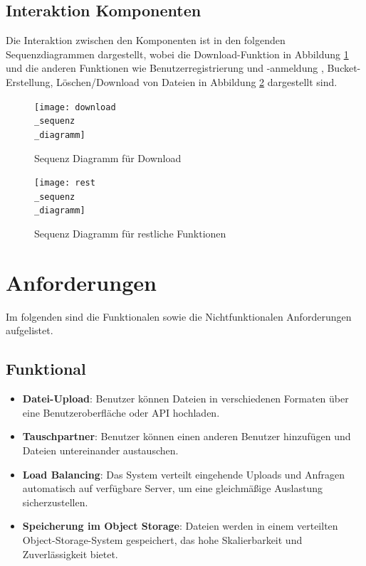 \documentclass[12pt]{report}
\begin{document}
		\subsection{Interaktion Komponenten}
			Die Interaktion zwischen den Komponenten ist in den folgenden Sequenzdiagrammen dargestellt, wobei die Download-Funktion in Abbildung \ref{fig:download_sequenz_diagramm} und die anderen Funktionen wie Benutzerregistrierung und -anmeldung , Bucket-Erstellung, Löschen/Download von Dateien in Abbildung \ref{fig:rest_sequenz_diagramm} dargestellt sind.
			
			\begin{figure}[h]
				\centering
				\texttt{[image: download\\\_sequenz\\\_diagramm]}
				\caption{Sequenz Diagramm für Download}
				\label{fig:download_sequenz_diagramm}
			\end{figure}
			
			\begin{figure}[h]
				\centering
				\texttt{[image: rest\\\_sequenz\\\_diagramm]}
				\caption{Sequenz Diagramm für restliche Funktionen}
				\label{fig:rest_sequenz_diagramm}
			\end{figure}
		
	\section{Anforderungen}
		Im folgenden sind die Funktionalen sowie die Nichtfunktionalen Anforderungen aufgelistet.
		\subsection{Funktional}
			\begin{itemize}
				\item \textbf{Datei-Upload}: Benutzer können Dateien in verschiedenen Formaten über eine Benutzeroberfläche oder API hochladen.
				\item \textbf{Tauschpartner}: Benutzer können einen anderen Benutzer hinzufügen und Dateien untereinander austauschen.
				\item \textbf{Load Balancing}: Das System verteilt eingehende Uploads und Anfragen automatisch auf verfügbare Server, um eine gleichmäßige Auslastung sicherzustellen.
				\item \textbf{Speicherung im Object Storage}: Dateien werden in einem verteilten Object-Storage-System gespeichert, das hohe Skalierbarkeit und Zuverlässigkeit bietet.
			\end{itemize}
\end{document}
